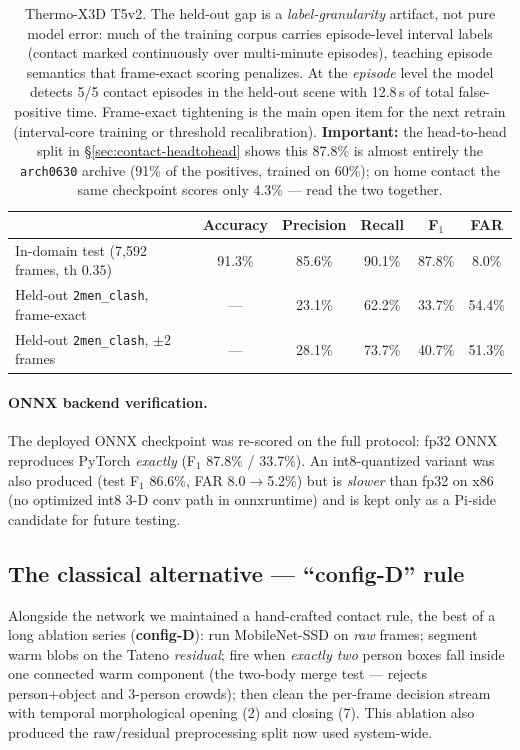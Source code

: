 \documentclass[11pt]{article}
\newcommand{\code}[1]{\texttt{\small #1}}
\begin{document}
\begin{table}[H]\centering\small
\begin{tabular}{lccccc}
\toprule
& Accuracy & Precision & Recall & F$_1$ & FAR\\
\midrule
In-domain test (7{,}592 frames, th $0.35$) & 91.3\% & 85.6\% & 90.1\% & 87.8\% & 8.0\%\\
Held-out \code{2men\_clash}, frame-exact & --- & 23.1\% & 62.2\% & 33.7\% & 54.4\%\\
Held-out \code{2men\_clash}, $\pm2$ frames & --- & 28.1\% & 73.7\% & 40.7\% & 51.3\%\\
\bottomrule
\end{tabular}
\caption{Thermo-X3D T5v2. The held-out gap is a \emph{label-granularity}
artifact, not pure model error: much of the training corpus carries
episode-level interval labels (contact marked continuously over
multi-minute episodes), teaching episode semantics that frame-exact
scoring penalizes. At the \emph{episode} level the model detects
5/5 contact episodes in the held-out scene with 12.8\,s of total
false-positive time. Frame-exact tightening is the main open item for
the next retrain (interval-core training or threshold recalibration).
\textbf{Important:} the head-to-head split in \S\ref{sec:contact-headtohead}
shows this 87.8\% is almost entirely the \code{arch0630} archive (91\% of
the positives, trained on 60\%); on home contact the same checkpoint scores
only 4.3\% --- read the two together.}
\end{table}

\paragraph{ONNX backend verification.} The deployed ONNX checkpoint was
re-scored on the full protocol: fp32 ONNX reproduces PyTorch \emph{exactly}
(F$_1$ 87.8\% / 33.7\%). An int8-quantized variant was also produced
(test F$_1$ 86.6\%, FAR 8.0$\to$5.2\%) but is \emph{slower} than fp32 on
x86 (no optimized int8 3-D conv path in onnxruntime) and is kept only as a
Pi-side candidate for future testing.

\subsection{The classical alternative --- ``config-D'' rule}
\label{sec:x3d-configd}

Alongside the network we maintained a hand-crafted contact rule, the best
of a long ablation series (\textbf{config-D}): run MobileNet-SSD on
\emph{raw} frames; segment warm blobs on the Tateno \emph{residual}; fire
when \emph{exactly two} person boxes fall inside one connected warm
component (the two-body merge test --- rejects person+object and 3-person
crowds); then clean the per-frame decision stream with temporal
morphological opening (2) and closing (7). This ablation also produced the
raw/residual preprocessing split now used system-wide.
\end{document}
